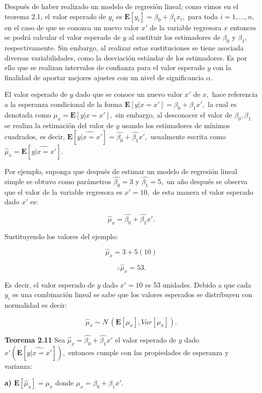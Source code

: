\documentclass[
  a4paper,
  oneside,
  openany]{book}
\begin{document}
Después de haber realizado un modelo de regresión lineal; como vimos en el teorema 2.1, el valor esperado de \(y_{i}\) es \(\mathbf{E}[y_{i}]=\beta_{0}+\beta_{1}x_{i},\) para toda \(i=1,\ldots,n,\) en el caso de que se conozca un nuevo valor \(x'\) de la variable regresora \(x\) entonces se podrá calcular el valor esperado de \(y\) al sustituir los estimadores de \(\beta_{0}\) y \(\beta_{1},\) respectivamente. Sin embargo, al realizar estas sustituciones se tiene asociada diversas variabilidades, como la desviación estándar de los estimadores. Es por ello que se realizan intervalos de confianza para el valor esperado \(y\) con la finalidad de aportar mejores ajustes con un nivel de significancia \(\alpha.\)

El valor esperado de \(y\) dado que se conoce un nuevo valor \(x'\) de \(x,\) hace referencia a la esperanza condicional de la forma \(\mathbf{E}[y|x=x']=\beta_{0}+\beta_{1}x',\) la cual es denotada como \(\mu_{x}=\mathbf{E}[y|x=x' ],\) sin embargo, al desconocer el valor de \(\beta_{0},\beta_{1}\) se realiza la estimación del valor de \(y\) usando los estimadores de mínimos cuadrados, es decir, \(\mathbf{E}[\widehat{y|x=x'}]=\hat{\beta_{0}}+\hat{\beta_{1}}x',\) usualmente escrita como \(\hat{\mu}_{x}=\mathbf{E}[\widehat{y|x=x'}].\)

Por ejemplo, suponga que después de estimar un modelo de regresión lineal simple se obtuvo como parámetros \(\hat{\beta_{0}}=3\) y \(\hat{\beta_{1}}=5,\) un año después se observa que el valor de la variable regresora es \(x'=10,\) de esta manera el valor esperado dado \(x'\) es:

\[\hat{\mu}_{x}=\hat{\beta_{0}}+\hat{\beta_{1}}x'.\]

Sustituyendo los valores del ejemplo:

\[\hat{\mu}_{x}=3+5(10)\]

\[\therefore \hat{\mu}_{x}=53.\]

Es decir, el valor esperado de \(y\) dado \(x'=10\) es 53 unidades. Debido a que cada \(y_{i}\) es una combinación lineal se sabe que los valores esperados se distribuyen con normalidad es decir:

\[\hat{\mu}_{x}\sim N \ (\mathbf{E}[\mu_{x}],Var[\mu_{x}]).\]

\textbf{Teorema 2.11} Sea \(\hat{\mu}_{x}=\hat{\beta_{0}}+\hat{\beta_{1}}x'\) el valor esperado de \(y\) dado \(x'\left( \mathbf{E}[\widehat{y|x=x'}]\right),\) entonces cumple con las propiedades de esperanza y varianza:

\textbf{a)} \(\mathbf{E}[\hat{\mu}_{x}]=\mu_{x}\) donde \(\mu_{x}=\beta_{0}+\beta_{1}x'.\)
\end{document}
